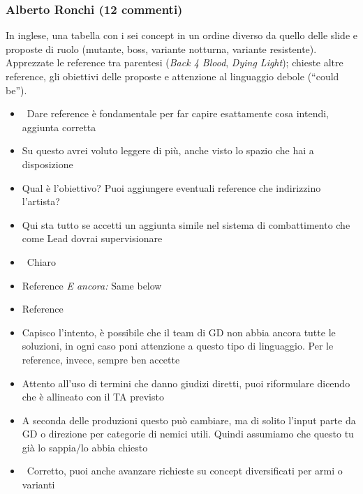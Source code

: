 \subsubsection{Alberto Ronchi (12 commenti)}
In inglese, una tabella con i sei concept in un ordine diverso da quello delle slide e proposte di ruolo (mutante, boss, variante notturna, variante resistente). Apprezzate le reference tra parentesi (\emph{Back 4 Blood}, \emph{Dying Light}); chieste altre reference, gli obiettivi delle proposte e attenzione al linguaggio debole (``could be'').
{\small
\begin{itemize}
  \item {} \rvBene\ Dare reference è fondamentale per far capire esattamente cosa intendi, aggiunta corretta
  \item {} Su questo avrei voluto leggere di più, anche visto lo spazio che hai a disposizione
  \item {} Qual è l'obiettivo? Puoi aggiungere eventuali reference che indirizzino l'artista?
  \item {} Qui sta tutto se accetti un aggiunta simile nel sistema di combattimento che come Lead dovrai supervisionare
  \item {} \rvBene\ Chiaro
  \item {} Reference \emph{E ancora:} Same below
  \item {} Reference
  \item {} Capisco l'intento, è possibile che il team di GD non abbia ancora tutte le soluzioni, in ogni caso poni attenzione a questo tipo di linguaggio. Per le reference, invece, sempre ben accette
  \item {} Attento all'uso di termini che danno giudizi diretti, puoi riformulare dicendo che è allineato con il TA previsto
  \item {} A seconda delle produzioni questo può cambiare, ma di solito l'input parte da GD o direzione per categorie di nemici utili. Quindi assumiamo che questo tu già lo sappia/lo abbia chiesto
  \item {} \rvBene\ Corretto, puoi anche avanzare richieste su concept diversificati per armi o varianti
\end{itemize}
}


